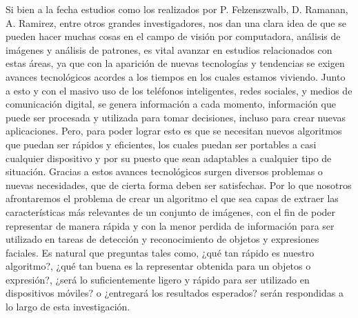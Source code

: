 Si bien a la fecha estudios como los realizados por P. Felzenszwalb, D. Ramanan, A. Ramirez, entre otros grandes investigadores, nos dan una clara idea de que se pueden hacer muchas cosas en el campo de visión por computadora, análisis de imágenes y análisis de patrones, es vital avanzar en estudios relacionados con estas áreas, ya que con la aparición de nuevas tecnologías y tendencias se exigen avances tecnológicos acordes a los tiempos en los cuales estamos viviendo. Junto a esto y con el masivo uso de los teléfonos inteligentes, redes sociales, y medios de comunicación digital, se genera información a cada momento, información que puede ser procesada y utilizada para tomar decisiones, incluso para crear nuevas aplicaciones. Pero, para poder lograr esto es que se necesitan nuevos algoritmos que puedan ser rápidos y eficientes, los cuales puedan ser portables a casi cualquier dispositivo y por su puesto que sean adaptables a cualquier tipo de situación. Gracias a estos avances tecnológicos surgen diversos problemas o nuevas necesidades, que de cierta forma deben ser satisfechas. Por lo que nosotros afrontaremos el problema de crear un algoritmo el que sea capas de extraer las características más relevantes de un conjunto de imágenes, con el fin de poder representar de manera rápida y con la menor perdida de información para ser utilizado en tareas de detección y reconocimiento de objetos y expresiones faciales. Es natural que preguntas tales como, ¿qué tan rápido es nuestro algoritmo?, ¿qué tan buena es la representar obtenida para un objetos o expresión?, ¿será lo suficientemente ligero y rápido para ser utilizado en dispositivos móviles? o ¿entregará los resultados esperados? serán respondidas a lo largo de esta investigación.


